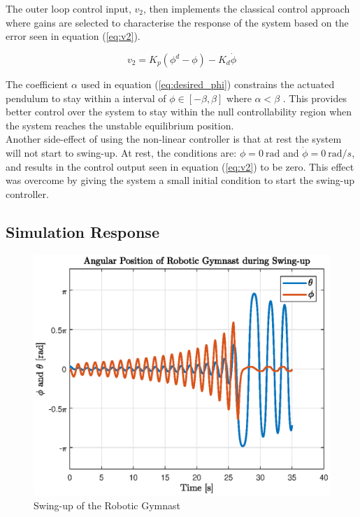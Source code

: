 The outer loop control input, $v_{2}$, then implements the classical control approach where gains are selected to characterise the response of the system based on the error seen in equation (\ref{eq:v2}). 

   
\begin{equation} \label{eq:v2}
v_{2} = K_{p}(\phi^{d}-\phi)-K_{d}\dot{\phi}
\end{equation}

The coefficient $\alpha$ used in equation (\ref{eq:desired_phi}) constrains the actuated pendulum to stay within a interval of $ \phi \in [-\beta,\beta]$ where $\alpha < \beta$ \citep{spong_swingup}. This provides better control over the system to stay within the null controllability region when the system reaches the unstable equilibrium position.\\

Another side-effect of using the non-linear controller is that at rest the system will not start to swing-up. At rest, the conditions are: $\phi = \SI{0}{\radian}$ and $\dot{\phi} = \SI{0}{\radian/s}$, and results in the control output seen in equation (\ref{eq:v2}) to be zero. This effect was overcome by giving the system a small initial condition to start the swing-up controller.


\subsection{Simulation Response}
\begin{figure}[h]
	\centering
	\includegraphics[scale=1]{./figs/swingup}
	\caption{Swing-up of the Robotic Gymnast}
	\label{fig:swingup}
\end{figure}

